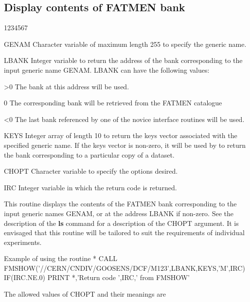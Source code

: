 \subsection{Display contents of FATMEN bank}
\begin{DLtt}{1234567}
\item[GENAM]
Character variable of maximum length 255 to specify the generic name.
\item[LBANK]
Integer variable to return the address of the bank corresponding
to the input generic name GENAM. LBANK can have the following values:
\begin{DLtt}{12}
\item[>0]The bank at this address will be used.
\item[0]The corresponding bank will be retrieved from the FATMEN catalogue
\item[<0]The last bank referenced by one of the novice interface routines
will be used.
\end{DLtt}
\item[KEYS]
Integer array of length 10 to return the keys vector associated
with the specified generic name. If the keys vector is non-zero,
it will be used by  to return the bank corresponding to
a particular copy of a dataset.
\item[CHOPT]
Character variable to specify the options desired.
\item[IRC]
Integer variable in which the return code is returned.
\end{DLtt}
\par
This routine displays the contents of the FATMEN bank corresponding to
the input generic names GENAM, or at the address LBANK if non-zero.
See the description of the {\bf ls} command for a description of
the CHOPT argument.
It is envisaged that this routine will be tailored to suit the
 requirements of individual experiments.
\begin{XMPt}{Example of using the \protect{} routine}
*
      CALL FMSHOW('//CERN/CNDIV/GOOSENS/DCF/M123',LBANK,KEYS,'M',IRC)
      IF(IRC.NE.0) PRINT *,'Return code ',IRC,' from FMSHOW'
\end{XMPt}
\par
The allowed values of CHOPT and their meanings are
